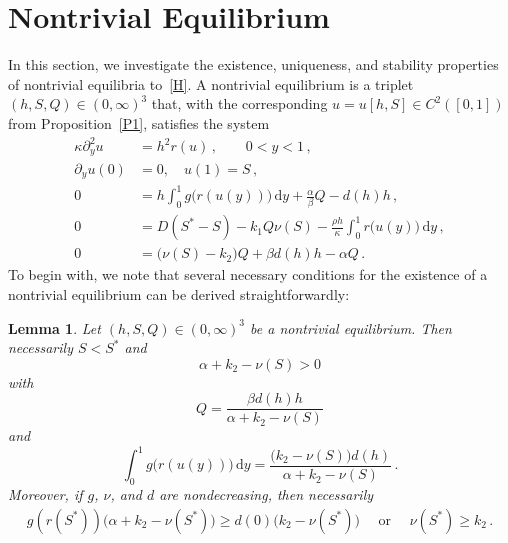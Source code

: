 \documentclass[reqno,11pt]{amsart}
\newtheorem{lem}[thm]{Lemma}
\numberwithin{equation}{section}
\newcommand{\rd}{\mathrm{d}}
\begin{document}
\section{Nontrivial Equilibrium}\label{Sec4}
In this section, we investigate the existence, uniqueness, and stability properties of nontrivial equilibria to~\eqref{H}. A nontrivial equilibrium is a triplet $(h,S,Q)\in (0,\infty)^3$ that, with the corresponding $u=u[h,S]\in C^2([0,1])$ from Proposition~\ref{P1}, satisfies the system 
\begin{subequations}\label{HSS}
\begin{align}
\kappa \partial_{y}^2u&= h^2 r(u)\,, \qquad 0<y<1\,,  \label{HSS1}\\
\partial_{y}u(0)&=0,\quad u(1)=S \,,\label{HSS2}\\
0&=h\int_0^{1} g\big(r(u(y))\big)\,\rd y +\frac{\alpha}{\beta} Q -d(h)h\,, \label{HSS3}\\
0&=D(S^*-S)-k_1 Q\nu(S)-\frac{\rho h}{\kappa} \int_0^1  r\bigl(
u(y)\bigr)\,\rd y\,, \label{HSS4}\\
0&= \big(\nu(S)-k_2\big)Q+\beta d(h)h-\alpha Q\,.\label{HSS5}
\end{align}
\end{subequations}
To begin with, we note that
several necessary conditions for the existence of a nontrivial equilibrium can be derived straightforwardly:

\begin{lem}
Let $(h,S,Q)\in (0,\infty)^3$ be a nontrivial equilibrium. Then necessarily $S<S^*$ and 
\begin{equation}\label{DeltaS}
\alpha+k_2-\nu(S)>0
\end{equation}
with
\begin{equation}\label{Q}
Q=\frac{\beta d(h)h}{\alpha+k_2-\nu(S)}
\end{equation}
and
\begin{equation}\label{gp}
\int_0^{1} g\big(r(u(y))\big)\,\rd y=\frac{\big(k_2-\nu(S)\big) d(h)}{\alpha+k_2-\nu(S)} \,.
\end{equation}
Moreover,  if $g$, $\nu$, and $d$ are nondecreasing, then necessarily
\begin{align}\label{n20}
g(r(S^*))\big(\alpha+k_2-\nu(S^*)\big)\ge d(0)\big(k_2 -\nu(S^*)\big) \quad \text{ or }\quad \nu(S^*)\ge k_2\,.
\end{align}
\end{lem}
\end{document}
